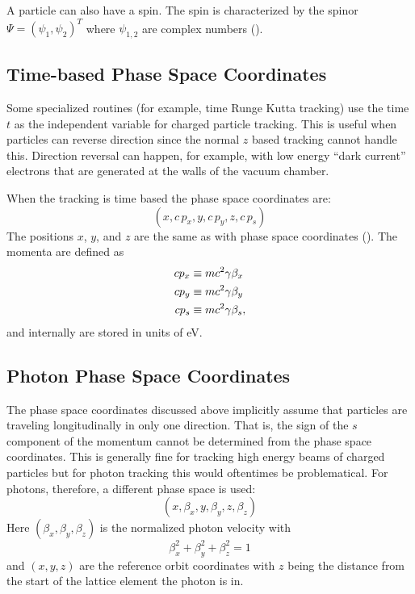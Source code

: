 A particle can also have a spin. The spin is characterized by the spinor $\Psi = \left( \psi_{1},
\psi_{2} \right)^{T}$ where $\psi_{1,2}$ are complex numbers ().

\subsection{Time-based Phase Space Coordinates}
\label{s:time.phase.space}

Some specialized routines (for example, time Runge Kutta tracking) use the time $t$ as the
independent variable for charged particle tracking. This is useful when particles can reverse
direction since the normal $z$ based tracking cannot handle this. Direction reversal can happen, for
example, with low energy ``dark current'' electrons that are generated at the walls of the vacuum
chamber.

When the tracking is time based the phase space coordinates are:
\begin{equation}
  (x, c \, p_x, y, c \, p_y, z, c \, p_s)
\end{equation}
The positions $x$, $y$, and $z$ are the same as with phase space coordinates
(). The momenta are defined as
\begin{align}
c p_x &\equiv m c^2 \gamma \beta_x \nonumber \\
c p_y &\equiv m c^2 \gamma \beta_y \\
c p_s &\equiv m c^2 \gamma \beta_s, \nonumber
\end{align}
and internally are stored in units of eV.

\subsection{Photon Phase Space Coordinates}
\label{s:photon.phase.space}

The phase space coordinates discussed above implicitly assume that
particles are traveling longitudinally in only one direction. That is,
the sign of the $s$ component of the momentum cannot be determined
from the phase space coordinates. This is generally fine for tracking
high energy beams of charged particles but for photon tracking this
would oftentimes be problematical. For photons, therefore, a different
phase space is used:
\begin{equation}
  (x, \beta_x, y, \beta_y, z, \beta_z)
  \label{xbybzb}
\end{equation}
Here $(\beta_x, \beta_y, \beta_z)$ is the normalized photon velocity with
\begin{equation}
  \beta_x^2 + \beta_y^2 + \beta_z^2 = 1 
  \label{bbb1}
\end{equation}
and $(x, y, z)$ are the reference orbit coordinates with $z$ being the
distance from the start of the lattice element the photon is in.

